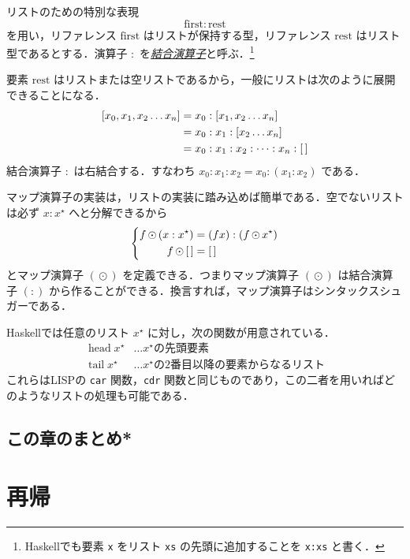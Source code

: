 \documentclass[a4paper]{jsbook}
\newcommand{\programminglanguage}[1]{\textsf{#1}}
\newcommand{\haskell}{\programminglanguage{Haskell}}
\newcommand{\lisp}{\programminglanguage{LISP}}
\newcommand{\keyword}[1]{{\underline{\emph{#1}}}}
\newcommand{\code}[1]{\texttt{#1}}
\newcommand{\mSpecialVar}[1]{\mathrm{#1}} %
\newcommand{\mFirstVar}{\mSpecialVar{first}}
\newcommand{\mRestVar}{\mSpecialVar{rest}}
\newcommand{\mListWith}[1]{\left[#1\right]}
\newcommand{\mList}[1]{{#1}^\mathrm{\star}}
\DeclareMathOperator{\mMapList}{\odot}
\DeclareMathOperator{\mHead}{head}
\DeclareMathOperator{\mTail}{tail}
\newcommand{\mathVarKeyword}[1]{\operatorname{\mathrm{#1}}}
\newcommand{\mFirstVar}{\mathVarKeyword{first}}
\begin{document}
リストのための特別な表現
\begin{equation}
\mFirstVar:\mRestVar
\end{equation}
を用い，リファレンス $\mFirstVar$ はリストが保持する型，リファレンス $\mRestVar$ はリスト型であるとする．演算子 $:$ を\keyword{結合演算子}と呼ぶ．\footnote{\haskell でも要素 \code{x} をリスト \code{xs} の先頭に追加することを \code{x:xs} と書く．}

要素 $\mRestVar$ はリストまたは空リストであるから，一般にリストは次のように展開できることになる．
\begin{align*}
\mListWith{x_0,x_1,x_2\dots x_n}
  &=x_0:\mListWith{x_1,x_2\dots x_n}\\
  &=x_0:x_1:\mListWith{x_2\dots x_n}\\
  &=x_0:x_1:x_2:\dots:x_n:\mEmptyList
\end{align*}
結合演算子 $:$ は右結合する．すなわち $x_0:x_1:x_2=x_0:(x_1:x_2)$ である．

マップ演算子の実装は，リストの実装に踏み込めば簡単である．空でないリストは必ず $x:\mList{x}$ へと分解できるから
\begin{equation}
\left\{
\begin{split}
f\mMapList{}(x:\mList{x})
  &=(fx):(f\mMapList\mList{x})\\
f\mMapList\mEmptyList
  &=\mEmptyList
\end{split}
\right.
\end{equation}
とマップ演算子 $(\mMapList)$ を定義できる．つまりマップ演算子 $(\mMapList)$ は結合演算子 $(:)$ から作ることができる．換言すれば，マップ演算子はシンタックスシュガーである．

\haskell では任意のリスト $\mList{x}$ に対し，次の関数が用意されている．
\begin{align*}
\mHead\mList{x}&\dots\text{$\mList{x}$の先頭要素}\\
\mTail\mList{x}&\dots\text{$\mList{x}$の2番目以降の要素からなるリスト}
\end{align*}
これらは\lisp  の \code{car} 関数，\code{cdr} 関数と同じものであり，この二者を用いればどのようなリストの処理も可能である．

\section*{この章のまとめ*}

\chapter{再帰}
\end{document}
